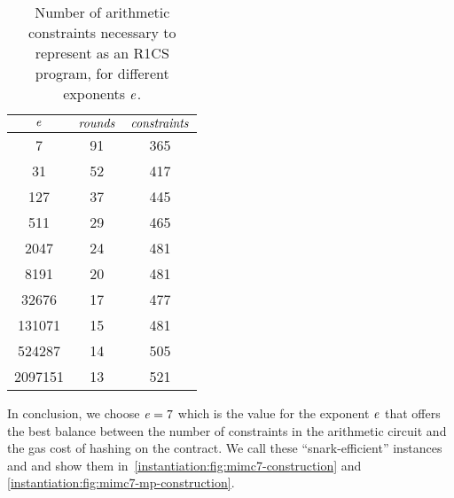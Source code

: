 \begin{table}
  \centering
    \begin{minipage}[t]{0.50\textwidth}
        \centering
        \begin{tabular}{c c c}
            \midrule
            $\mathit{e}{}$ & $\mathit{rounds}$ & $\mathit{constraints}$ \\ [0.5ex]
            \midrule
            7 & 91 & 365\\
            \midrule
            31 & 52 & 417\\
            \midrule
            127 & 37 & 445\\
            \midrule
            511 & 29 & 465\\
            \midrule
            2047 & 24 & 481\\
            \midrule
            8191 & 20 & 481\\
            \midrule
            32676 & 17 & 477\\
            \midrule
            131071 & 15 & 481\\
            \midrule
            524287 & 14 & 505\\
            \midrule
            2097151 & 13 & 521\\
            \bottomrule
        \end{tabular}
    \end{minipage}%
    \caption{Number of arithmetic constraints necessary to represent \mimcMP{} as an R1CS program, for different exponents $\mathit{e}{}$.}\label{table:mimc-exp-analysis}
\end{table}

In conclusion, we choose $\mathit{e}{} = 7$ which is the value for the exponent $\mathit{e}{}$ that offers the best balance between the number of constraints in the arithmetic circuit and the gas cost of hashing on the contract. We call these ``snark-efficient'' instances \mimcSevenPrime{} and \mimcSevenMPPrime{} and show them in~\cref{instantiation:fig:mimc7-construction} and \cref{instantiation:fig:mimc7-mp-construction}.

